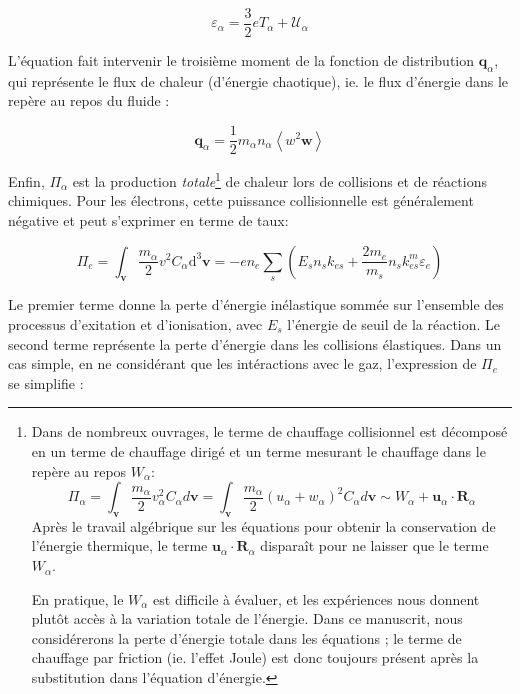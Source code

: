 \begin{refsection}
\begin{equation}
\varepsilon_\alpha=\frac{3}{2}eT_\alpha+\mathcal{U}_\alpha
\end{equation}

 L'équation fait intervenir le
troisième moment de la fonction de distribution $\mathbf q_\alpha$, qui
représente le flux de chaleur (d'énergie chaotique), ie. le flux d'énergie dans le repère au repos du fluide :

\begin{equation}
	\mathbf q_\alpha=\frac{1}{2}m_\alpha
	n_\alpha\left<w^2\mathbf w\right>
\end{equation} 

Enfin, $\Pi_\alpha$ est la production \emph{totale}\footnote{Dans de
nombreux ouvrages, le terme de chauffage collisionnel est décomposé en un terme de chauffage dirigé et un terme mesurant
le chauffage dans le repère au repos ${W}_\alpha$:
$$\Pi_\alpha=\int_{\mathbf v}\frac{m_\alpha}{2}v_\alpha^2C_\alpha
d\mathbf v=\int_{\mathbf v}\frac{m_\alpha}{2}(u_\alpha+w_\alpha)^2C_\alpha d\mathbf
v\sim{W}_\alpha+\mathbf u_\alpha\cdot\mathbf R_\alpha $$ Après le
travail algébrique sur les équations pour obtenir la conservation de l'énergie
thermique, le terme $\mathbf u_\alpha\cdot\mathbf R_\alpha$ disparaît pour
ne laisser que le terme ${W}_\alpha$. 

En pratique, le
${W}_\alpha$ est difficile à évaluer, et les expériences nous donnent
plutôt accès à la variation totale de l'énergie.
Dans ce manuscrit, nous
considérerons la perte d'énergie totale dans les équations ; le terme de
chauffage par friction (ie.
l'effet Joule) est donc toujours présent après la substitution dans l'équation d'énergie.} de chaleur lors de collisions et de
réactions chimiques.
Pour les électrons, cette puissance collisionnelle est généralement négative et peut s'exprimer en terme de taux:

\begin{equation}
	\Pi_e=\int_{\mathbf
	v}\frac{m_\alpha}{2}v^2C_\alpha \text{d}^3\mathbf
	v=-en_e\sum_{s}\left(E_sn_sk_{es}+\frac{2m_e}{m_s}n_sk^m_{es}\varepsilon_e\right)
\end{equation}

Le premier terme donne la perte d'énergie inélastique sommée sur l'ensemble
des processus d'exitation et d'ionisation, avec $E_s$ l'énergie de seuil de la
réaction. Le second terme représente la perte d'énergie dans les collisions
élastiques. Dans un cas simple, en ne considérant que les intéractions avec le
gaz, l'expression de $\Pi_e$ se simplifie :


\end{refsection}
